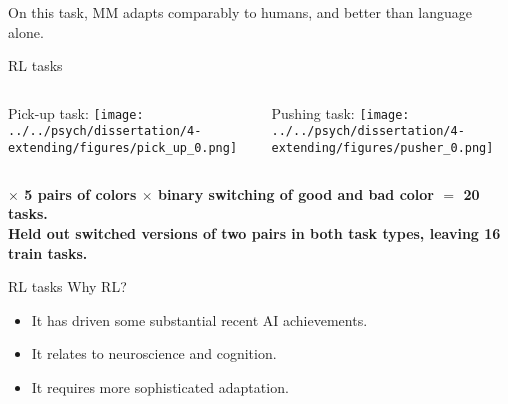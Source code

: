 \documentclass{beamer}
\begin{document}
\begin{frame}[standout]
On this task, MM adapts comparably to humans, and better than language alone. \\[1em]
\end{frame}

\begin{frame}{RL tasks}
\begin{columns}
\begin{column}{0.5\textwidth}
Pick-up task:
\texttt{[image: ../../psych/dissertation/4-extending/figures/pick\_up\_0.png]}%
\end{column}
\begin{column}{0.5\textwidth}
Pushing task:
\texttt{[image: ../../psych/dissertation/4-extending/figures/pusher\_0.png]}
\end{column}
\end{columns}
\vspace{1em}
{\bf
\(\mathbf{\times}\) 5 pairs of colors \(\mathbf{\times}\) binary switching of good and bad color \(\mathbf{=}\) 20 tasks.\\
Held out switched versions of two pairs in both task types, leaving 16 train tasks.
}
\end{frame}

\begin{frame}{RL tasks}
Why RL? 
\begin{itemize}
\item It has driven some substantial recent AI achievements.
\item It relates to neuroscience and cognition.
\item It requires more sophisticated adaptation. 
\end{itemize}
\end{frame}
\end{document}
